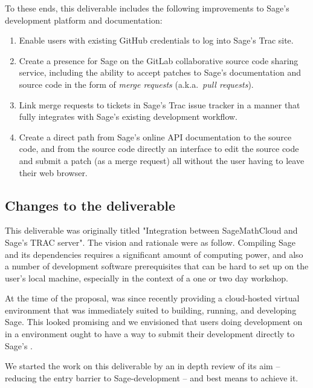 To these ends, this deliverable includes the following improvements to Sage's
development platform and documentation:
\begin{enumerate}
\item Enable users with existing GitHub credentials to log into Sage's
    Trac site.
\item Create a presence for Sage on the GitLab collaborative source code
    sharing service, including the ability to accept patches to Sage's
    documentation and source code in the form of {\em merge requests}
    (a.k.a.~{\em pull requests}).
\item Link \GitLab merge requests to tickets in Sage's Trac issue tracker in
    a manner that fully integrates with Sage's existing development workflow.
\item Create a direct path from Sage's online API documentation to the source
    code, and from the source code directly an interface to edit the source
    code and submit a patch (as a merge request) all without the user having to
    leave their web browser.
\end{enumerate}



\hypertarget{changes-to-deliverable}{%
\subsection{Changes to the deliverable\label{changes-to-deliverable}}}


This deliverable was originally titled "Integration between
SageMathCloud and Sage's TRAC server". The vision and rationale were
as follow. Compiling Sage and its dependencies requires a significant
amount of computing power, and also a number of development software
prerequisites that can be hard to set up on the user's local machine,
especially in the context of a one or two day workshop.

At the time of the proposal, \cocalc was since recently providing a
cloud-hosted virtual environment that was immediately suited to
building, running, and developing Sage. This looked promising and we
envisioned that users doing development on \Sage in a \cocalc
environment ought to have a way to submit their development directly
to Sage's \Trac.

We started the work on this deliverable by an in depth review of its
aim -- reducing the entry barrier to Sage-development -- and best
means to achieve it.

